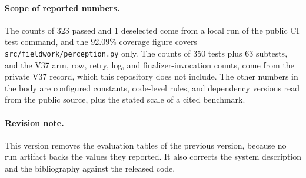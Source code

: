 \documentclass{article}
\begin{document}
\paragraph{Scope of reported numbers.}
The counts of 323 passed and 1 deselected come from a local run of the public CI test command, and the 92.09\% coverage figure covers \texttt{src/fieldwork/perception.py} only. The counts of 350 tests plus 63 subtests, and the V37 arm, row, retry, log, and finalizer-invocation counts, come from the private V37 record, which this repository does not include. The other numbers in the body are configured constants, code-level rules, and dependency versions read from the public source, plus the stated scale of a cited benchmark.

\paragraph{Revision note.}
This version removes the evaluation tables of the previous version, because no run artifact backs the values they reported. It also corrects the system description and the bibliography against the released code.
\end{document}
